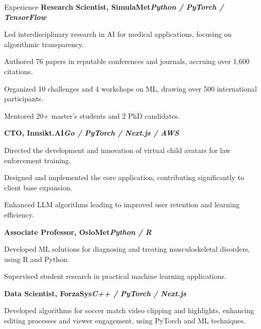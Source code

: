 \begin{rubric}{Experience}
%
\entry*[2021 -- present]%
\textbf{Research Scientist, SimulaMet\hfill\textit{Python / PyTorch / TensorFlow}} \par
\begin{compactitem}
\item Led interdisciplinary research in AI for medical applications, focusing on algorithmic transparency.
\item Authored 76 papers in reputable conferences and journals, accruing over 1,600 citations.
\item Organized 10 challenges and 4 workshops on ML, drawing over 500 international participants.
\item Mentored 20+ master's students and 2 PhD candidates.
\vspace{-12pt}
\end{compactitem}
%
\entry*[2023 -- present]%
\textbf{CTO, Innsikt.AI\hfill\textit{Go / PyTorch / Next.js / AWS}} \par
\begin{compactitem}
\item Directed the development and innovation of virtual child avatars for law enforcement training.
\item Designed and implemented the core application, contributing significantly to client base expansion.
\item Enhanced LLM algorithms leading to improved user retention and learning efficiency.
\vspace{-12pt}
\end{compactitem}
%
\entry*[2023 -- present]%
\textbf{Associate Professor, OsloMet\hfill\textit{Python / R}} \par
\begin{compactitem}
\item Developed ML solutions for diagnosing and treating musculoskeletal disorders, using R and Python.
\item Supervised student research in practical machine learning applications.
\vspace{-12pt}
\end{compactitem}
%
\entry*[2022 -- 2023]%
\textbf{Data Scientist, ForzaSys\hfill\textit{C++ / PyTorch / Next.js}} \par
\begin{compactitem}
\item Developed algorithms for soccer match video clipping and highlights, enhancing editing processes and viewer engagement, using PyTorch and ML techniques.

\end{compactitem}
\end{rubric}
